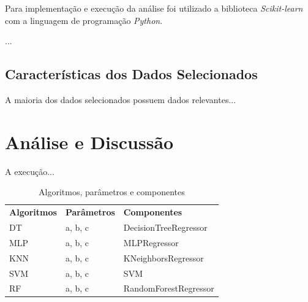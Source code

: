 \documentclass[12pt]{article}
\begin{document}
Para implementação e execução da análise foi utilizado a biblioteca \textit{Scikit-learn} \cite{scikitlearn:2011} com a linguagem de programação \textit{Python}.

...

\subsection{Características dos Dados Selecionados}

A maioria dos dados selecionados possuem dados relevantes...

\section{Análise e Discussão}

A execução...

\begin{table}[h!]
  \begin{center}
    \caption{Algoritmos, parâmetros e componentes}
    \label{tab_algoritmos}
    \begin{tabular}{l|l|l}
      \textbf{Algoritmos} & \textbf{Parâmetros} & \textbf{Componentes}  \\
      DT                  & a, b, c             & DecisionTreeRegressor \\
      MLP                 & a, b, c             & MLPRegressor          \\
      KNN                 & a, b, c             & KNeighborsRegressor   \\
      SVM                 & a, b, c             & SVM                   \\
      RF                  & a, b, c             & RandomForestRegressor \\
    \end{tabular}
  \end{center}
\end{table}
\end{document}
